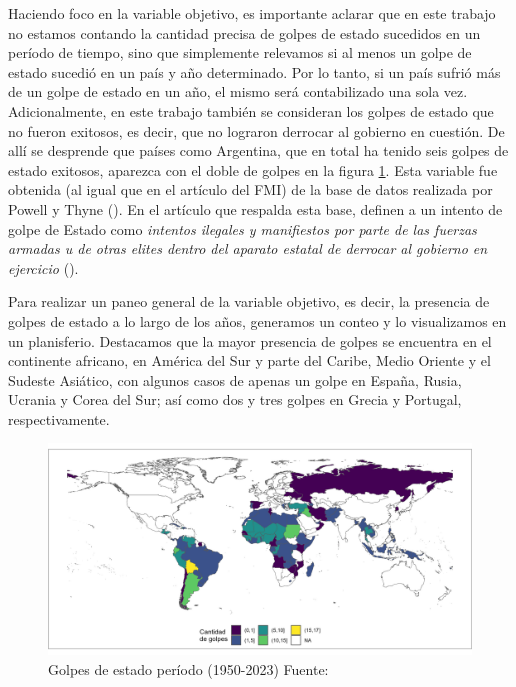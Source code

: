 \documentclass{article}
\begin{document}
Haciendo foco en la variable objetivo, es importante aclarar que en este trabajo no 
estamos contando la cantidad precisa
de golpes de estado sucedidos en un período de tiempo, sino que simplemente relevamos
si al menos un golpe de estado sucedió en un país y año determinado. Por lo tanto, si
un país sufrió más de un golpe de estado en un año, el mismo será contabilizado una
sola vez. Adicionalmente, en este trabajo también se consideran los golpes de estado
que no fueron exitosos, es decir, que no lograron derrocar al gobierno en cuestión. 
De allí se desprende que países como Argentina, que en total ha tenido seis golpes de 
estado exitosos, aparezca con el doble de golpes en la figura \ref{fig::mapa_golpes}.
Esta variable fue obtenida (al igual que en el artículo del FMI) de la base de datos
realizada por Powell y Thyne (\citeyear{Pow11}). En el artículo que respalda esta base, 
definen a un intento de golpe de Estado como \textit{intentos ilegales y manifiestos por parte 
de las fuerzas armadas u de otras elites dentro del aparato estatal de derrocar al 
gobierno en ejercicio} (\cite[p.~252]{Pow11}).

Para realizar un paneo general de la variable objetivo, es decir, la presencia de
golpes de estado a lo largo de los años, generamos un conteo y lo visualizamos en un 
planisferio. Destacamos que la mayor presencia de golpes se encuentra en el 
continente africano, en América del Sur y parte del Caribe, Medio Oriente y el 
Sudeste Asiático, con algunos casos de apenas un golpe en España, Rusia, Ucrania 
y Corea del Sur; así como dos y tres golpes en Grecia y Portugal, respectivamente.

\begin{figure}[H]
 \centering 
 \includegraphics[width=1\textwidth]{2_golpes.png}
 \caption{Golpes de estado período (1950-2023) Fuente: \cite{Pow11} \label{fig::mapa_golpes}}
\end{figure}
\end{document}
